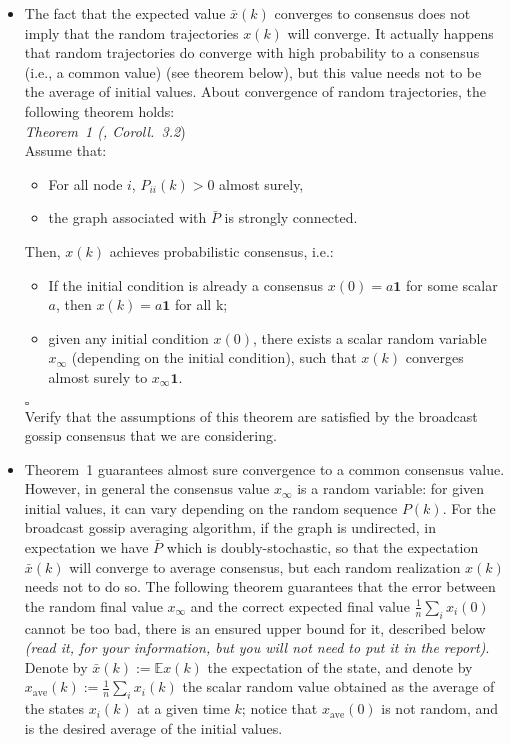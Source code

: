 \documentclass{article}
\begin{document}
\begin{itemize}
\begin{itemize}
	\item The fact that the expected value $\bar x(k)$ converges to consensus does not imply that the random trajectories $x(k)$ will converge. It actually happens that random trajectories do converge with high probability to a consensus (i.e., a common value) (see theorem below), but this value needs not to be the average of initial values.
	About convergence of random trajectories, the following theorem holds:\\
	\textit{Theorem~1 (\cite{gossip-converg-as}, Coroll.~3.2})\\
	Assume that:
		\begin{itemize}
		\item For all node $i$, $P_{ii}(k)>0$ almost surely,
		\item the graph associated with $\bar P$ is strongly connected.
		\end{itemize}
	Then, $x(k)$ achieves probabilistic consensus, i.e.:
		\begin{itemize}
		\item If the initial condition is already a consensus $x(0) = a \mathbf 1$ for some scalar $a$, then
		$x(k) = a \mathbf 1$ for all k;
		\item given any initial condition $x(0)$, there exists a scalar random variable $x_{\infty}$ (depending on the initial condition), such that $x(k)$ converges almost surely to $x_{\infty} \mathbf 1$.
		\end{itemize}
	\hfill $\square$ \\
	Verify that the assumptions of this theorem are satisfied by the broadcast gossip consensus that we are considering.
	 \item
	 Theorem~1 guarantees almost sure convergence to a common consensus value. However, in general the consensus value $x_{\infty}$ is a random variable: for given initial values, it can vary depending on the random sequence $P(k)$. For the broadcast gossip averaging algorithm, if the graph is undirected, in expectation we have $\bar P$ which is doubly-stochastic, so that the expectation $\bar x(k)$ will converge to average consensus, but each random realization $x(k)$ needs not to do so. The following theorem guarantees that the error between the random final value $x_{\infty}$ and the correct expected final value $\frac{1}{n}\sum_i x_i(0)$ cannot be too bad, there is an ensured upper bound for it, described below \textit{(read it, for your information, but you will not need to put it in the report)}. \\
	 Denote by $\bar x(k) :=  \mathbb E x(k)$ the expectation of the state, and denote by $x_{\text{ave}}(k) := \frac{1}{n}\sum_i x_i(k)$ the scalar random value obtained as the average of the states $x_i(k)$ at a given time $k$; notice that $x_{\text{ave}}(0)$ is not random, and is the desired average of the initial values.

\end{itemize}
\end{itemize}
\end{document}
